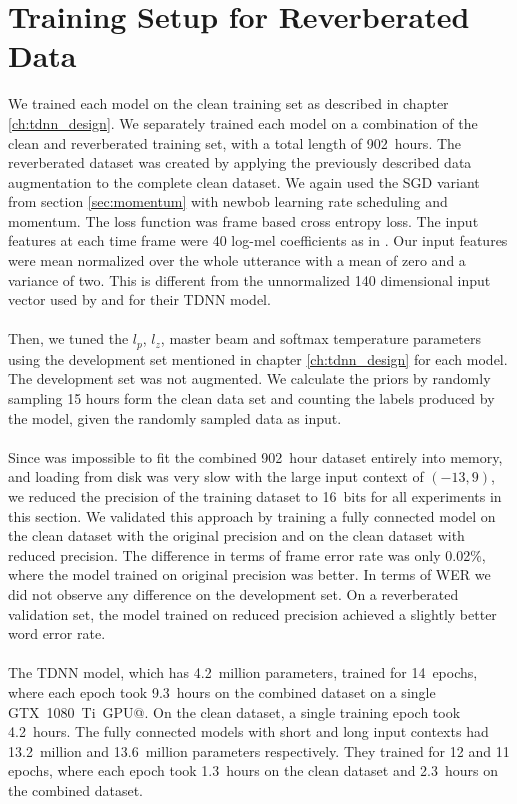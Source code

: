 \section{Training Setup for Reverberated Data}
We trained each model on the clean training set as described in chapter \ref{ch:tdnn_design}. We separately trained each model on a combination of the clean and reverberated training set, with a total length of 902~hours. The reverberated dataset was created by applying the previously described data augmentation to the complete clean dataset. We again used the SGD variant from section \ref{sec:momentum} with newbob learning rate scheduling and momentum. The loss function was frame based cross entropy loss. The input features at each time frame were 40 log-mel coefficients as in \cite{nguyen20162016}. Our input features were mean normalized over the whole utterance with a mean of zero and a variance of two. This is different from the unnormalized 140 dimensional input vector used by \cite{peddinti2015reverberation} and \cite{peddinti2015jhu} for their TDNN model.\\ \\
Then, we tuned the $l_p$, $l_z$, master beam and softmax temperature parameters using the development set mentioned in chapter \ref{ch:tdnn_design} for each model. The development set was not augmented. We calculate the priors by randomly sampling 15 hours form the clean data set and counting the labels produced by the model, given the randomly sampled data as input. \\ \\ 
Since was impossible to fit the combined 902~hour dataset entirely into memory, and loading from disk was very slow with the large input context of $(-13, 9)$, we reduced the precision of the training dataset to 16~bits for all experiments in this section. We validated this approach by training a fully connected model on the clean dataset with the original precision and on the clean dataset with reduced precision. The difference in terms of frame error rate was only 0.02\%, where the model trained on original precision was better. In terms of WER we did not observe any difference on the development set. On a reverberated validation set, the model trained on reduced precision achieved a slightly better word error rate. \\ \\
The TDNN model, which has 4.2~million parameters, trained for 14~epochs, where each epoch took 9.3~hours on the combined dataset on a single GTX~1080~Ti~GPU@. On the clean dataset, a single training epoch took 4.2~hours. The fully connected models with short and long input contexts had 13.2~million and 13.6~million parameters respectively. They trained for 12 and 11 epochs, where each epoch took 1.3~hours on the clean dataset and 2.3~hours on the combined dataset. \\ \\
